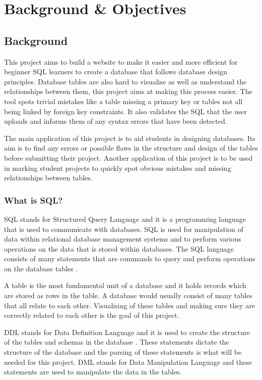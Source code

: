 
\chapter{Background \& Objectives}

\section{Background}

This project aims to build a website to make it easier and more efficient for beginner SQL learners to create a database that follows database design principles. Database tables are also hard to visualise as well as understand the relationships between them, this project aims at making this process easier. The tool spots trivial mistakes like a table missing a primary key or tables not all being linked by foreign key constraints. It also validates the SQL that the user uploads and informs them of any syntax errors that have been detected.

The main application of this project is to aid students in designing databases. Its aim is to find any errors or possible flaws in the structure and design of the tables before submitting their project. Another application of this project is to be used in marking student projects to quickly spot obvious mistakes and missing relationships between tables.

\subsection{What is SQL?}

SQL stands for Structured Query Language and it is a programming language that is used to communicate with databases. SQL is used for manipulation of data within relational database management systems and to perform various operations on the data that is stored within databases. The SQL language consists of many statements that are commands to query and perform operations on the database tables \cite{SQL}.

A table is the most fundamental unit of a database and it holds records which are stored as rows in the table. A database would usually consist of many tables that all relate to each other. Visualising of these tables and making sure they are correctly related to each other is the goal of this project. 

DDL stands for Data Definition Language and it is used to create the structure of the tables and schemas in the database \cite{ddlAndDml}. These statements dictate the structure of the database and the parsing of these statements is what will be needed for this project. DML stands for Data Manipulation Language and these statements are used to manipulate the data in the tables. 

